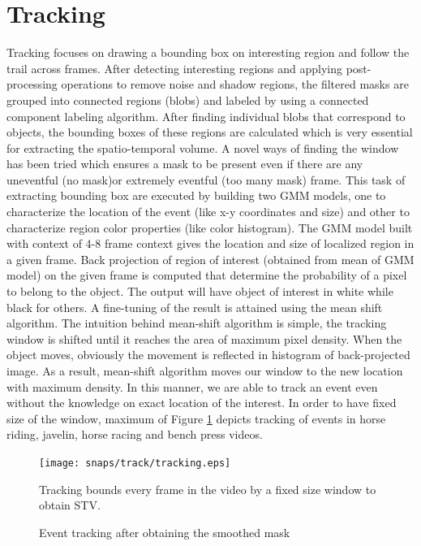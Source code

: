 \section{Tracking}
 \label{sec:trac}
Tracking focuses on drawing a bounding box  on interesting region and follow the trail across frames. After detecting interesting  regions and applying post-processing operations to remove noise and shadow regions, the filtered masks are grouped into connected regions (blobs) and labeled by using a connected component labeling algorithm. After finding individual blobs that correspond to objects, the bounding boxes of these regions are calculated which is very essential for extracting the spatio-temporal volume. A novel ways of finding the  window  has been tried which ensures a mask to be present even if there are any uneventful (no mask)or extremely eventful (too many mask) frame. 
This task of extracting bounding box are executed by building two GMM models, one to characterize the location of the event (like x-y coordinates and size) and other to characterize region color properties (like color histogram). The GMM model built with context of 4-8 frame context gives the location and size of localized region  in a given frame. Back projection \citep{backProj} of region of interest (obtained from mean of GMM model) on the given frame is computed that determine the probability of a pixel to belong to the object. The output  will have object of interest in white while black for others. A fine-tuning of the result is attained using the mean shift algorithm.  The intuition behind mean-shift algorithm is simple, the tracking window is shifted until it reaches the area of maximum pixel density. When the object moves, obviously the movement is reflected in histogram of back-projected image. As a result, mean-shift algorithm moves our window to the new location with maximum density. In this manner, we are able to track an event even without the knowledge on exact location of the interest. In order to have fixed size of the window, maximum of Figure \ref{fig:tracking} depicts tracking of events  in  horse riding, javelin, horse racing and bench press videos.
\begin{figure}[htpb]
   \begin{center}
	    \texttt{[image: snaps/track/tracking.eps]}     
     \caption {Event tracking after obtaining the smoothed mask}
     \medskip \small 
     Tracking bounds every frame in the video by a fixed size window to obtain STV.
   \label{fig:tracking}
   \end{center}
 \end{figure}


